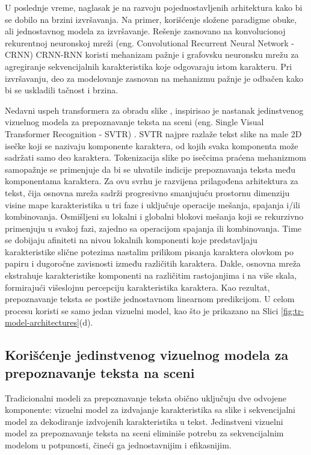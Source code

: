 \documentclass[a4paper,12pt]{article}
\begin{document}
	U poslednje vreme, naglasak je na razvoju pojednostavljenih arhitektura kako bi se dobilo na brzini izvršavanja. Na primer, korišćenje složene paradigme obuke, ali jednostavnog modela za izvršavanje. Rešenje zasnovano na konvolucionoj rekurentnoj neuronskoj mreži (eng. Convolutional Recurrent Neural Network - CRNN) CRNN-RNN \cite{Hu_Cai_Hou_Yi_Lin_2020} koristi mehanizam pažnje i grafovsku neuronsku mrežu za agregiranje sekvencijalnih karakteristika koje odgovaraju istom karakteru. Pri izvršavanju, deo za modelovanje zasnovan na mehanizmu pažnje je odbačen kako bi se uskladili tačnost i brzina.
	
	Nedavni uspeh transformera za obradu slike \cite{dosovitskiy2021imageworth16x16words, liu2021swintransformerhierarchicalvision}, inspirisao je nastanak jedinstvenog vizuelnog modela za prepoznavanje teksta na sceni (eng. Single Visual Transformer Recognition - SVTR) \cite{du2022svtrscenetextrecognition}. SVTR najpre razlaže tekst slike na male 2D isečke koji se nazivaju komponente karaktera, od kojih svaka komponenta može sadržati samo deo karaktera. Tokenizacija slike po isečcima praćena mehanizmom samopažnje se primenjuje da bi se uhvatile indicije prepoznavanja teksta među komponentama karaktera. Za ovu svrhu je razvijena prilagođena arhitektura za tekst, čija osnovna mreža sadrži progresivno smanjujuću prostornu dimenziju visine mape karakteristika u tri faze i uključuje operacije mešanja, spajanja i/ili kombinovanja. Osmišljeni su lokalni i globalni blokovi mešanja koji se rekurzivno primenjuju u svakoj fazi, zajedno sa operacijom spajanja ili kombinovanja. Time se dobijaju afiniteti na nivou lokalnih komponenti koje predstavljaju karakteristike slične potezima nastalim prilikom pisanja karaktera olovkom po papiru i dugoročne zavisnosti između različitih karaktera. Dakle, osnovna mreža ekstrahuje karakteristike komponenti na različitim rastojanjima i na više skala, formirajući višeslojnu percepciju karakteristika karaktera. Kao rezultat, prepoznavanje teksta se postiže jednostavnom linearnom predikcijom. U celom procesu koristi se samo jedan vizuelni model, kao što je prikazano na Slici \ref{fig:tr-model-architectures}(d).

	\subsection{Korišćenje jedinstvenog vizuelnog modela za prepoznavanje teksta na sceni}
	
	Tradicionalni modeli za prepoznavanje teksta obično uključuju dve odvojene komponente: vizuelni model za izdvajanje karakteristika sa slike i sekvencijalni model za dekodiranje izdvojenih karakteristika u tekst. Jedinstveni vizuelni model za prepoznavanje teksta na sceni eliminiše potrebu za sekvencijalnim modelom u potpunosti, čineći ga jednostavnijim i efikasnijim.
	
\end{document}
